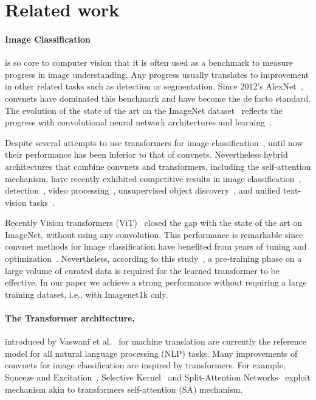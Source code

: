\section{Related work}
\label{sec:related}

\paragraph{Image Classification} is so core to computer vision that it is often used as a benchmark to measure progress in image understanding. 
Any progress usually translates to improvement in other related tasks such as detection or segmentation. 
Since 2012's AlexNet~\cite{Krizhevsky2012AlexNet}, convnets have dominated this benchmark and have become the de facto standard.
The evolution of the state of the art on the ImageNet dataset~\cite{Russakovsky2015ImageNet12} reflects the progress with convolutional neural network architectures and learning~\cite{Krizhevsky2012AlexNet,Simonyan2015VGG,tan2019efficientnet,Touvron2019FixRes,Touvron2020FixingTT,Xie2019SelftrainingWN}.

Despite several attempts to use transformers for image classification~\cite{chen2020generative}, until now their performance has been inferior to that of convnets.
Nevertheless hybrid architectures that combine convnets and transformers, including the self-attention mechanism, have recently exhibited competitive results in image classification~\cite{wu2020visual}, detection~\cite{carion2020end,Hu2018RelationNF}, video processing~\cite{Sun2019VideoBERTAJ,Wang2018NonlocalNN}, unsupervised object discovery~\cite{Locatello2020ObjectCentricLW}, and unified text-vision tasks~\cite{Chen2020UNITERUI,li2019visualbert,Lu2019ViLBERTPT}.



Recently Vision transformers (ViT)~\cite{dosovitskiy2020image} closed the gap with the state of the art on ImageNet, without using any convolution.
This performance is remarkable since convnet methods for image classification have benefited from years of tuning and optimization~\cite{he2019bag,pytorchmodels}.
Nevertheless, according to this study~\cite{dosovitskiy2020image}, a pre-training phase on a large volume of curated data is required for the learned transformer to be effective. 
% 
In our paper we achieve a strong performance without requiring a large training dataset, i.e., with Imagenet1k only. 
%
\paragraph{The Transformer architecture,}
%
introduced by Vaswani et al.~\cite{Vaswani2017AttentionIA} for machine translation are currently the reference model for all natural language processing (NLP) tasks.
Many improvements of convnets for image classification are inspired by transformers.
For example, Squeeze and Excitation~\cite{Hu2017SENet}, Selective Kernel~\cite{Li2019SelectiveKN} and Split-Attention Networks~\cite{zhang2020resnest} exploit mechanism akin to transformers self-attention (SA) mechanism.

